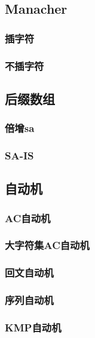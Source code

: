 \documentclass[a4paper,twocolumn]{article}
\begin{document}
\subsection{Manacher}
\subsubsection{插字符}

\subsubsection{不插字符}

\subsection{后缀数组}
\subsubsection{倍增sa}

\subsubsection{SA-IS}

\subsection{自动机}
\subsubsection{AC自动机}

\subsubsection{大字符集AC自动机}

\subsubsection{回文自动机}

\subsubsection{序列自动机}

\subsubsection{KMP自动机}

\end{document}
